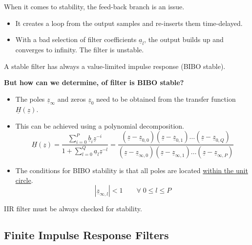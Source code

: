 \begin{refsection}
When it comes to stability, the feed-back branch is an issue.
\begin{itemize}
	\item It creates a loop from the output samples and re-inserts them time-delayed.
	\item With a bad selection of filter coefficients $\underline{a}_l$, the output builds up and converges to infinity. The filter is unstable.
\end{itemize}
A stable filter has always a value-limited impulse response (\ac{BIBO} stable).

\textbf{But how can we determine, of filter is \ac{BIBO} stable?}
\begin{itemize}
	\item The poles $\underline{z}_{\infty}$ and zeros $\underline{z}_{0}$ need to be obtained from the transfer function $\underline{H}(\underline{z})$.
	\item This can be achieved using a polynomial decomposition.
	\begin{equation}
		\underline{H}(\underline{z}) = \frac{\sum\limits_{i=0}^{P} \underline{b}_i \underline{z}^{-i}}{1 + \sum\limits_{l=0}^{Q} \underline{a}_l \underline{z}^{-l}} = \frac{\left(\underline{z}-\underline{z}_{0,0}\right)\left(\underline{z}-\underline{z}_{0,1}\right)\dots\left(\underline{z}-\underline{z}_{0,Q}\right)}{\left(\underline{z}-\underline{z}_{\infty,0}\right)\left(\underline{z}-\underline{z}_{\infty,1}\right)\dots\left(\underline{z}-\underline{z}_{\infty,P}\right)}
	\end{equation}
	\item The conditions for \ac{BIBO} stability is that all poles are located \underline{within the unit circle}.
	\begin{equation}
		\left|\underline{z}_{\infty,l}\right| < 1 \qquad \forall \; 0 \leq l \leq P
	\end{equation}
\end{itemize}

\begin{fact}
	\acs{IIR} filter must be always checked for stability.
\end{fact}

\subsection{Finite Impulse Response Filters}


\end{refsection}
